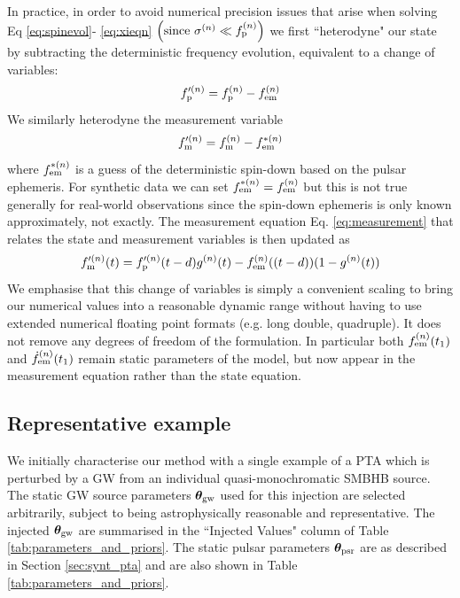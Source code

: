 \documentclass[fleqn,usenatbib,useAMS]{mnras}
\begin{document}
In practice, in order to avoid numerical precision issues that arise when solving Eq \ref{eq:spinevol}- \ref{eq:xieqn} $\left ( \text{since } \sigma^{(n)} \ll f_{\rm p}^{(n)} \right)$ we first ``heterodyne" our state by subtracting the deterministic frequency evolution, equivalent to a change of variables:
\begin{equation}
	f_{\rm p}^{\prime (n)} = f_{\rm p}^{(n)} - f_{\rm em}^{(n)}
\end{equation}  
We similarly heterodyne the measurement variable 
\begin{equation}
	f_{\rm m}^{\prime (n)} = f_{\rm m}^{(n)} - f_{\rm em}^{*(n)}
\end{equation}
where $ f_{\rm em}^{*(n)}$ is a guess of the deterministic spin-down based on the pulsar ephemeris. For synthetic data we can set $ f_{\rm em}^{*(n)} = f_{\rm em}^{(n)}$ but this is not true generally for real-world observations since the spin-down ephemeris is only known approximately, not exactly. The measurement equation Eq. \ref{eq:measurement} that relates the state and measurement variables is then updated as 
\begin{equation}
	f_{\rm m}^{\prime (n)}(t) = f_{\rm p}^{\prime (n)}(t-d) g^{(n)}(t) -  f_{\rm em}^{(n)}((t-d))(1-g^{(n)}(t))
	\label{eq:measurement_cov}
\end{equation}
We emphasise that this change of variables is simply a convenient scaling to bring our numerical values into a reasonable dynamic range without having to use extended numerical floating point formats (e.g. long double, quadruple). It does not remove any degrees of freedom of the formulation. In particular both $f_{\rm em}^{(n)}(t_1)$
and $\dot{f}_{\rm em}^{(n)}(t_1)$ remain static parameters of the model, but now appear in the measurement equation rather than the state equation.


\subsection{Representative example}\label{sec:rep_example}
We initially characterise our method with a single example of a PTA which is perturbed by a GW from an individual quasi-monochromatic SMBHB source. The static GW source parameters $\boldsymbol{\theta}_{\rm gw}$ used for this injection are selected arbitrarily, subject to being astrophysically reasonable and representative. The injected $\boldsymbol{\theta}_{\rm gw}$ are summarised in the ``Injected Values" column of Table \ref{tab:parameters_and_priors}. The static pulsar parameters $\boldsymbol{\theta}_{\rm psr}$ are as described in Section \ref{sec:synt_pta} and are also shown in Table \ref{tab:parameters_and_priors}. 
\end{document}
